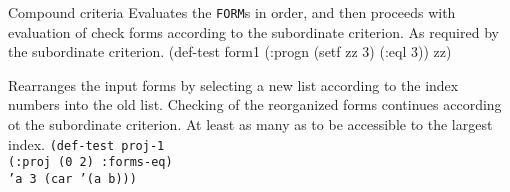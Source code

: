 \begin{criteriaGroup}{Compound criteria}{}
{Evaluates the \texttt{FORM}s in order, and then proceeds with
evaluation of check forms according to the subordinate criterion.}
{As required by the subordinate criterion.}
{\noExpl}
{\singleEx}
{(def-test form1 (:progn (setf zz 3) (:eql 3)) zz)}

{Rearranges the input forms by selecting a new list according to the
index numbers into the old list.  Checking of the reorganized forms
continues according ot the subordinate criterion.}
{At least as many as to be accessible to the largest
index.}
{}
{\tabbingEx}
{\texttt{(d}\=\texttt{ef}\=\texttt{-test proj-1}
\\ \>\> \texttt{(:proj (0 2) :forms-eq)}
\\ \> \texttt{'a 3 (car '(a b)))}}

\end{criteriaGroup}

